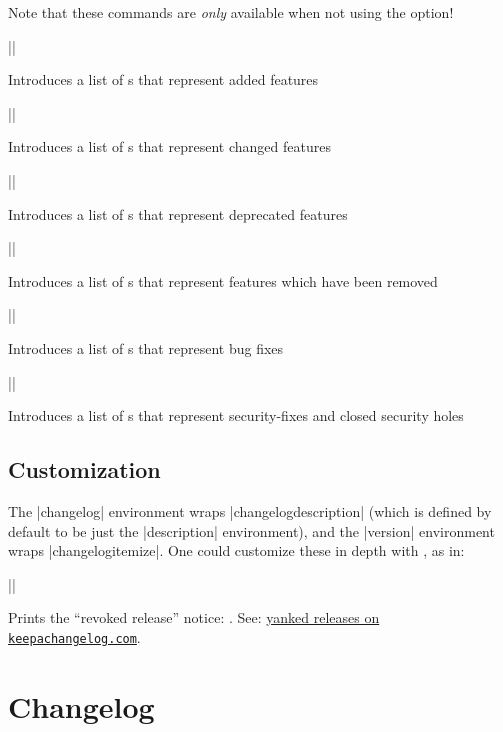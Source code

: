 \documentclass{ltxguidex}
\begin{document}
Note that these commands are \emph{only} available when not using
the  option!

\begin{desc}|\added|\end{desc}Introduces a list of s that represent added
	features
\begin{desc}|\changed|\end{desc}Introduces a list of s that represent
	changed features
\begin{desc}|\deprecated|\end{desc}Introduces a list of s that represent
	deprecated features
\begin{desc}|\removed|\end{desc}Introduces a list of s that represent
	features which have been removed
\begin{desc}|\fixed|\end{desc}Introduces a list of s that represent bug
	fixes
\begin{desc}|\security|\end{desc}Introduces a list of s that represent
	security-fixes and closed security holes

\subsection{Customization}

The |changelog| environment wraps |changelogdescription| (which is
defined by default to be just the |description| environment), and the
|version| environment wraps |changelogitemize|. One could customize
these in depth with , as in:

\begin{latexcode}
\usepackage{enumitem}
\renewenvironment{changelogitemize}
	{\begin{itemize}[label=---]}
	{\end{itemize}}
\end{latexcode}

\begin{desc}
|\changelogyanked|
\end{desc}
Prints the ``revoked release'' notice:
\changelogyanked. See:
\href{https://keepachangelog.com/en/1.0.0/#yanked}{yanked releases on
\texttt{keepachangelog.com}}.

\section{Changelog}
\end{document}
